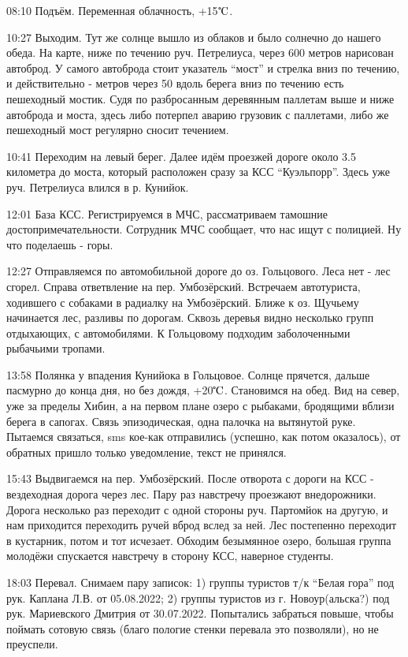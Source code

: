 08:10 Подъём. Переменная облачность, +15$\tccentigrade$.

10:27 Выходим.
Тут же солнце вышло из облаков и было солнечно до нашего обеда.
На карте, ниже по течению руч. Петрелиуса, через 600 метров нарисован автоброд.
У самого автоброда стоит указатель “мост” и стрелка вниз по течению, и действительно - метров через 50 вдоль берега
вниз по течению есть пешеходный мостик. Судя по разбросанным деревянным паллетам выше и ниже автоброда и моста,
здесь либо потерпел аварию грузовик с паллетами, либо же пешеходный мост регулярно сносит течением.

10:41 Переходим на левый берег. Далее идём проезжей дороге около 3.5 километра до моста,
который расположен сразу за КСС “Куэльпорр”. Здесь уже руч. Петрелиуса влился в р. Кунийок.

12:01 База КСС. Регистрируемся в МЧС, рассматриваем тамошние достопримечательности.
Сотрудник МЧС сообщает, что нас ищут с полицией. Ну что поделаешь - горы.

12:27 Отправляемся по автомобильной дороге до оз. Гольцового. Леса нет - лес сгорел.
Справа ответвление на пер. Умбозёрский. Встречаем автотуриста, ходившего с собаками в радиалку на Умбозёрский.
Ближе к оз. Щучьему начинается лес, разливы по дорогам. Сквозь деревья видно несколько групп отдыхающих, с автомобилями.
К Гольцовому подходим заболоченными рыбачьими тропами.

13:58 Полянка у впадения Кунийока в Гольцовое. Солнце прячется, дальше пасмурно до конца дня, но без дождя, +20$\tccentigrade$.
Становимся на обед. Вид на север, уже за пределы Хибин, а на первом плане озеро с рыбаками,
бродящими вблизи берега в сапогах. Связь эпизодическая, одна палочка на вытянутой руке. Пытаемся связаться,
sms кое-как отправились (успешно, как потом оказалось), от обратных пришло только уведомление, текст не принялся.

15:43 Выдвигаемся на пер. Умбозёрский. После отворота с дороги на КСС - вездеходная дорога через лес.
Пару раз навстречу проезжают внедорожники. Дорога несколько раз переходит с одной стороны руч. Партомйок на другую,
и нам приходится переходить ручей вброд вслед за ней. Лес постепенно переходит в кустарник, потом и тот исчезает.
Обходим безымянное озеро, большая группа молодёжи спускается навстречу в сторону КСС, наверное студенты.

18:03 Перевал. Снимаем пару записок: 1) группы туристов т/к ``Белая гора'' под рук. Каплана Л.В. от 05.08.2022;
2) группы туристов из г. Новоур(альска?) под рук. Мариевского Дмитрия от 30.07.2022.
Попытались забраться повыше, чтобы поймать сотовую связь (благо пологие стенки перевала это позволяли), но не преуспели.

